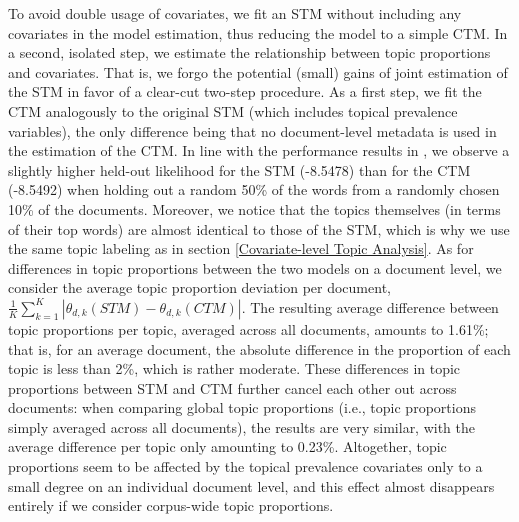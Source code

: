 To avoid double usage of covariates, we fit an STM without including any covariates in the model estimation, thus reducing the model to a simple CTM. In a second, isolated step, we estimate the relationship between topic proportions and covariates. That is, we forgo the potential (small) gains of joint estimation of the STM in favor of a clear-cut two-step procedure. As a first step, we fit the CTM analogously to the original STM (which includes topical prevalence variables), the only difference being that no document-level metadata is used in the estimation of the CTM. In line with the performance results in \cite{roberts2016model}, we observe a slightly higher held-out likelihood for the STM (-8.5478) than for the CTM (-8.5492) when holding out a random 50\% of the words from a randomly chosen 10\% of the documents. Moreover, we notice that the topics themselves (in terms of their top words) are almost identical to those of the STM, which is why we use the same topic labeling as in section \ref{Covariate-level Topic Analysis}. As for differences in topic proportions between the two models on a document level, we consider the average topic proportion deviation per document, $\frac{1}{K}\sum_{k=1}^{K}|\theta_{d,k}(STM)-\theta_{d,k}(CTM)|$. The resulting average difference between topic proportions per topic, averaged across all documents, amounts to 1.61\%; that is, for an average document, the absolute difference in the proportion of each topic is less than 2\%, which is rather moderate. These differences in topic proportions between STM and CTM further cancel each other out across documents: when comparing global topic proportions (i.e., topic proportions simply averaged across all documents), the results are very similar, with the average difference per topic only
amounting to 0.23\%. Altogether, topic proportions seem to be affected by the topical prevalence covariates only to a small degree on an individual document level, and this effect almost disappears entirely if we consider corpus-wide topic proportions.

